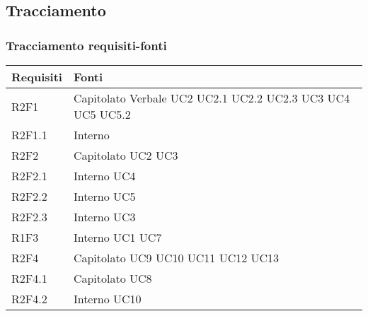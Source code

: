 \subsection{Tracciamento}
\label{sec:tracciamento}
\subsubsection{Tracciamento requisiti-fonti}
\begin{center}
	\renewcommand{\arraystretch}{1.5}
	\begin{longtable}{  p{5cm} p{5cm} }
		\rowcolor{tableHeadYellow}
		\textbf{Requisiti} & \textbf{Fonti} \\
		\endhead 
		
		R2F1 & Capitolato \newline Verbale \newline UC2 \newline UC2.1 \newline UC2.2 \newline UC2.3 \newline UC3 \newline UC4 \newline UC5 \newline UC5.2\\
		R2F1.1 & Interno \\
		R2F2 & Capitolato \newline UC2 \newline UC3 \\
		R2F2.1 & Interno \newline UC4 \\
		R2F2.2 & Interno \newline UC5 \\
		R2F2.3 & Interno \newline UC3 \\
		R1F3 & Interno \newline UC1 \newline UC7 \\
		R2F4 & Capitolato \newline UC9 \newline UC10 \newline UC11 \newline UC12 \newline UC13 \\
		R2F4.1 & Capitolato \newline UC8 \\
		R2F4.2 & Interno \newline UC10 \\

\end{longtable}
\end{center}
